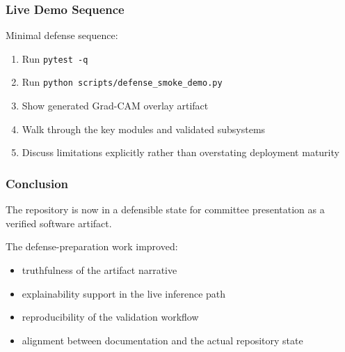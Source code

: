 \documentclass{beamer}
\begin{document}
\begin{frame}
  \frametitle{Live Demo Sequence}
  Minimal defense sequence:

  \begin{enumerate}
    \item Run \texttt{pytest -q}
    \item Run \texttt{python scripts/defense\_smoke\_demo.py}
    \item Show generated Grad-CAM overlay artifact
    \item Walk through the key modules and validated subsystems
    \item Discuss limitations explicitly rather than overstating deployment maturity
  \end{enumerate}
\end{frame}

\begin{frame}
  \frametitle{Conclusion}
  The repository is now in a defensible state for committee presentation as a verified software artifact.

  \vspace{0.4cm}
  The defense-preparation work improved:

  \begin{itemize}
    \item truthfulness of the artifact narrative
    \item explainability support in the live inference path
    \item reproducibility of the validation workflow
    \item alignment between documentation and the actual repository state
  \end{itemize}
\end{frame}
\end{document}
